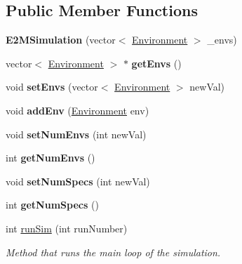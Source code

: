 \subsection*{Public Member Functions}
\begin{DoxyCompactItemize}
\item 
\mbox{\label{classE2MSimulation_addbbeb65c91d569a20ddd01ff251fb05}} 
{\bfseries E2\+M\+Simulation} (vector$<$ \hyperlink{classEnvironment}{Environment} $>$ \+\_\+envs)
\item 
\mbox{\label{classE2MSimulation_afbbbc3eb05c8e6a9f88c906a95c33ffd}} 
vector$<$ \hyperlink{classEnvironment}{Environment} $>$ $\ast$ {\bfseries get\+Envs} ()
\item 
\mbox{\label{classE2MSimulation_a9fc625c0e66768b4b70cc2b682a3316a}} 
void {\bfseries set\+Envs} (vector$<$ \hyperlink{classEnvironment}{Environment} $>$ new\+Val)
\item 
\mbox{\label{classE2MSimulation_a3cc272d636e0ce6cec2a55cc5cd7970d}} 
void {\bfseries add\+Env} (\hyperlink{classEnvironment}{Environment} env)
\item 
\mbox{\label{classE2MSimulation_a433cdd06ccf6fce0636e9c05a1f6eb3a}} 
void {\bfseries set\+Num\+Envs} (int new\+Val)
\item 
\mbox{\label{classE2MSimulation_a04040a96efb80654c6ab3d71c55e43df}} 
int {\bfseries get\+Num\+Envs} ()
\item 
\mbox{\label{classE2MSimulation_a08698e0fb7b4be7f1e9369aeeec85ca2}} 
void {\bfseries set\+Num\+Specs} (int new\+Val)
\item 
\mbox{\label{classE2MSimulation_a113e3427b21a4a6151026d35dc258110}} 
int {\bfseries get\+Num\+Specs} ()
\item 
int \hyperlink{classE2MSimulation_aeac4e92c10f89a5c953ace5b1327d20b}{run\+Sim} (int run\+Number)
\begin{DoxyCompactList}\small\item\em Method that runs the main loop of the simulation. \end{DoxyCompactList}\end{DoxyCompactItemize}
